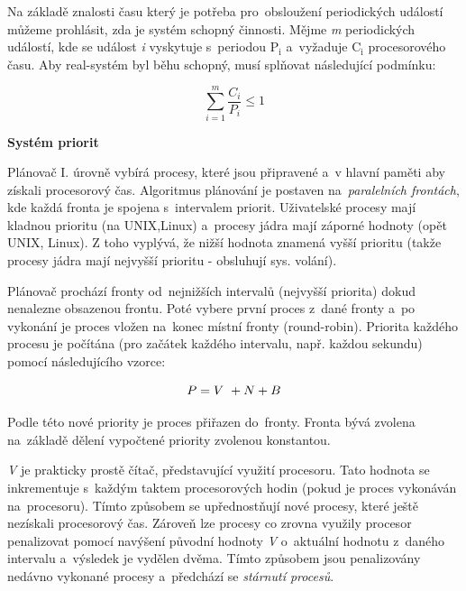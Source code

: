 \vspace{0,5cm}

Na základě znalosti času který je potřeba pro~obsloužení periodických událostí můžeme prohlásit, zda je systém schopný činnosti. Mějme \emph{m} periodických událostí, kde se událost \emph{i} vyskytuje s~periodou $\mathrm{P_i}$ a~vyžaduje $\mathrm{C_i}$ procesorového času. Aby real-systém byl běhu schopný, musí splňovat následující podmínku:

\begin{equation}
    \sum\limits_{i=1}^m \frac{C_i}{P_i} \leq 1 \nonumber \nonumber 
\end{equation}

\clearpage

\begin{Large}
    \vspace{0,5cm}
    \textbf{Systém priorit}
\end{Large}

Plánovač I. úrovně vybírá procesy, které jsou připravené a~v hlavní paměti aby získali procesorový čas. Algoritmus plánování je postaven na~\emph{paralelních frontách}, kde každá fronta je spojena s~intervalem priorit. Uživatelské procesy mají kladnou prioritu (na UNIX,Linux) a~procesy jádra mají záporné hodnoty (opět UNIX, Linux). Z toho vyplývá, že nižší hodnota znamená vyšší prioritu (takže procesy jádra mají nejvyšší prioritu - obsluhují sys. volání).  

\vspace{0,5cm}

Plánovač prochází fronty od~nejnižších intervalů (nejvyšší priorita) dokud nenalezne obsazenou frontu. Poté vybere první proces z~dané fronty a~po vykonání je proces vložen na~konec místní fronty (round-robin). Priorita každého procesu je počítána (pro začátek každého intervalu, např. každou sekundu) pomocí následujícího vzorce:

\begin{equation}
    P = V~+ N + B \nonumber \notag
\end{equation}

Podle této nové priority je proces přiřazen do~fronty. Fronta bývá zvolena na~základě dělení vypočtené priority zvolenou konstantou. 

\vspace{0,5cm}

\emph{V} je prakticky prostě čítač, představující využití procesoru. Tato hodnota se inkrementuje s~každým taktem procesorových hodin (pokud je proces vykonáván na~procesoru). Tímto způsobem se upřednostňují nové procesy, které ještě nezískali procesorový čas. Zároveň lze procesy co zrovna využily procesor penalizovat pomocí navýšení původní hodnoty \emph{V} o~aktuální hodnotu z~daného intervalu a~výsledek je vydělen dvěma. Tímto způsobem jsou penalizovány nedávno vykonané procesy a~předchází se \emph{stárnutí procesů}.

